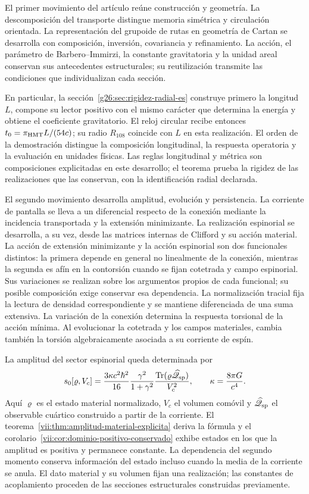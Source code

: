 El primer movimiento del artículo reúne construcción y geometría. La
descomposición del transporte distingue memoria simétrica y circulación
orientada. La representación del grupoide de rutas en geometría de Cartan
se desarrolla con composición, inversión, covariancia y refinamiento. La
acción, el parámetro de Barbero--Immirzi, la constante gravitatoria y la
unidad areal conservan sus antecedentes estructurales; su reutilización
transmite las condiciones que individualizan cada sección.

En particular, la sección~\ref{g26:sec:rigidez-radial-es} construye
primero la longitud \(L\), compone su lector positivo con el mismo
carácter que determina la energía y obtiene el coeficiente gravitatorio.
El reloj circular recibe entonces
\(t_0=\pi_{\rm HMT}L/(54c)\); su radio \(R_{108}\) coincide con
\(L\) en esta realización. El orden de la demostración distingue la
composición longitudinal, la respuesta operatoria y la evaluación en
unidades físicas. Las reglas longitudinal y métrica son composiciones
explicitadas en este desarrollo; el teorema prueba la rigidez de las
realizaciones que las conservan, con la identificación radial declarada.

El segundo movimiento desarrolla amplitud, evolución y persistencia.
La corriente de pantalla se lleva a un diferencial respecto de la
conexión mediante la incidencia transportada y la extensión minimizante.
La realización espinorial se desarrolla, a su vez, desde las matrices
internas de Clifford y su acción material. La acción de extensión
minimizante y la acción espinorial son dos funcionales distintos: la
primera depende en general no linealmente de la conexión, mientras la
segunda es afín en la contorsión cuando se fijan cotetrada y campo
espinorial. Sus variaciones se realizan sobre los argumentos propios de
cada funcional; su posible composición exige conservar esa dependencia.
La normalización tracial
fija la lectura de densidad correspondiente y se mantiene diferenciada de
una suma extensiva. La variación de la conexión determina la respuesta
torsional de la acción mínima. Al evolucionar la cotetrada y los campos
materiales, cambia también la torsión algebraicamente asociada a su
corriente de espín.

La amplitud del sector espinorial queda determinada por
\begin{equation}
 s_0[\varrho,V_c]
 =\frac{3\kappa c^2\hbar^2}{16}
   \frac{\gamma^2}{1+\gamma^2}
   \frac{\operatorname{Tr}
    (\varrho\widehat{\mathscr Q}_{\rm sp})}{V_c^2},
 \qquad \kappa=\frac{8\pi G}{c^4}.
 \label{vii:eq:programa-amplitud}
\end{equation}
Aquí \(\varrho\) es el estado material normalizado, \(V_c\) el volumen
comóvil y \(\widehat{\mathscr Q}_{\rm sp}\) el observable cuártico
construido a partir de la corriente. El
teorema~\ref{vii:thm:amplitud-material-explicita} deriva la fórmula y
el corolario~\ref{vii:cor:dominio-positivo-conservado} exhibe estados
en los que la amplitud es positiva y permanece constante. La dependencia
del segundo momento conserva información del estado incluso cuando la
media de la corriente se anula. El dato material y su volumen fijan una
realización; las constantes de acoplamiento proceden de las secciones
estructurales construidas previamente.

